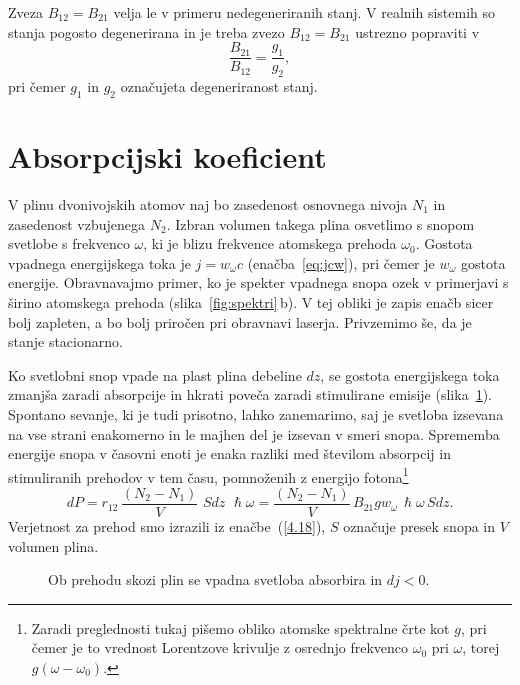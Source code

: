 \begin{remark}
 Zveza $B_{12}=B_{21}$ velja le v primeru nedegeneriranih stanj. V realnih sistemih
 so stanja pogosto degenerirana in je treba zvezo $B_{12}=B_{21}$ ustrezno popraviti v
\begin{equation}
\frac{B_{21}}{B_{12}} = \frac{g_1}{g_2},
\label{eq:ABdeg}
\end{equation}
pri čemer $g_{1}$ in $g_2$ označujeta degeneriranost stanj. 
\end{remark}

\section{Absorpcijski koeficient}
V plinu dvonivojskih atomov naj bo zasedenost osnovnega nivoja $N_1$ in zasedenost vzbujenega
$N_2$. Izbran volumen takega plina osvetlimo s snopom svetlobe s frekvenco
$\omega$, ki je blizu frekvence atomskega prehoda $\omega_{0}$. Gostota
vpadnega energijskega toka je $j=w_{\omega}c$ (enačba~\ref{eq:jcw}), 
pri čemer je $w_{\omega}$ gostota energije. Obravnavajmo primer, ko je 
spekter vpadnega snopa ozek v primerjavi s širino atomskega prehoda
(slika~\ref{fig:spektri}\,b). V tej obliki je zapis enačb sicer bolj zapleten,
a bo bolj priročen pri obravnavi laserja. Privzemimo še, da
je stanje stacionarno. 

Ko svetlobni snop vpade na plast plina debeline $dz$, se gostota
energijskega toka zmanjša zaradi absorpcije in hkrati poveča zaradi 
stimulirane emisije (slika~\ref{fig:abs}). 
Spontano sevanje, ki je tudi prisotno, lahko zanemarimo, saj
je svetloba izsevana na vse strani enakomerno in le majhen del je izsevan v smeri snopa.
Sprememba energije snopa v časovni enoti je enaka razliki med 
številom absorpcij in stimuliranih prehodov v tem času, pomnoženih z 
energijo fotona\footnote{Zaradi preglednosti tukaj pišemo obliko atomske spektralne črte kot $g$, 
pri čemer je to vrednost Lorentzove krivulje z osrednjo frekvenco $\omega_0$ pri $\omega$, 
torej $g(\omega-\omega_0)$.}
\begin{equation}
dP=r_{12}\,\frac{(N_{2}-N_{1})}{V}\,\,S dz\, \, \hslash\omega = 
\frac{(N_{2}-N_{1})}{V}\,B_{21}g w_{\omega} \, \hslash\omega \,S dz.
\label{4.28}
\end{equation}
Verjetnost za prehod smo izrazili iz enačbe~(\ref{4.18}),
$S$ označuje presek snopa in $V$ volumen plina. 
\begin{figure}[h]
\centering
\def\svgwidth{70truemm} 

\caption{Ob prehodu skozi plin se vpadna svetloba absorbira in $dj < 0$.}
\label{fig:abs}
\end{figure}

